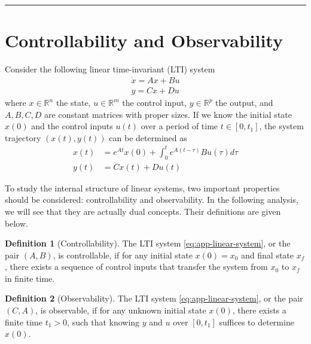 \documentclass[
]{book}
\theoremstyle{definition}
\newtheorem{definition}{Definition}[chapter]
\theoremstyle{definition}
\theoremstyle{definition}
\theoremstyle{definition}
\theoremstyle{remark}
\begin{document}
\begin{center}\rule{0.5\linewidth}{0.5pt}\end{center}

\hypertarget{app-lti-controllable-observable}{%
\section{Controllability and Observability}\label{app-lti-controllable-observable}}

Consider the following linear time-invariant (LTI) system
\begin{equation}
    \label{eq:app-linear-system}
   \begin{split}
      \dot{x} = A x + B u \\ 
      y = C x + D u
   \end{split}
\end{equation}
where \(x \in \mathbb{R}^n\) the state, \(u \in \mathbb{R}^m\) the control input, \(y \in \mathbb{R}^p\) the output, and \(A,B,C,D\) are constant matrices with proper sizes. If we know the initial state \(x(0)\) and the control inputs \(u(t)\) over a period of time \(t \in [0, t_1]\), the system trajectory \((x(t), y(t))\) can be determined as
\begin{equation}
    \label{eq:app-lti-xy}
   \begin{split}
      x(t) & = e^{At} x(0) + \int_{0}^{t} e^{A(t-\tau)} B u(\tau) d\tau \\ 
      y(t) & = C x(t) + D u(t)
   \end{split}
\end{equation}

To study the internal structure of linear systems, two important properties should be considered: controllability and observability. In the following analysis, we will see that they are actually dual concepts. Their definitions \citep{chen1984book-linear} are given below.

\begin{definition}[Controllability]
\protect\hypertarget{def:lticontrollable}{}\label{def:lticontrollable}The LTI system \eqref{eq:app-linear-system}, or the pair \((A, B)\), is controllable, if for any initial state \(x(0) = x_0\) and final state \(x_f\), there exists a sequence of control inputs that transfer the system from \(x_0\) to \(x_f\) in finite time.
\end{definition}

\begin{definition}[Observability]
\protect\hypertarget{def:ltiobservable}{}\label{def:ltiobservable}The LTI system \eqref{eq:app-linear-system}, or the pair \((C, A)\), is observable, if for any unknown initial state \(x(0)\), there exists a finite time \(t_1 > 0\), such that knowing \(y\) and \(u\) over \([0, t_1]\) suffices to determine \(x(0)\).
\end{definition}
\end{document}
